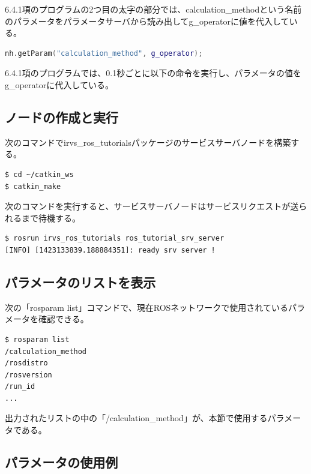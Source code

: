 6.4.1項のプログラムの2つ目の太字の部分では、calculation\_methodという名前のパラメータをパラメータサーバから読み出してg\_operatorに値を代入している。

\begin{lstlisting}[language=C++]
nh.getParam("calculation_method", g_operator);
\end{lstlisting}

6.4.1項のプログラムでは、0.1秒ごとに以下の命令を実行し、パラメータの値をg\_operatorに代入している。

\subsection{ノードの作成と実行}

次のコマンドでirvs\_ros\_tutorialsパッケージのサービスサーバノードを構築する。

\begin{lstlisting}[language=ROS]
$ cd ~/catkin_ws
$ catkin_make
\end{lstlisting}

次のコマンドを実行すると、サービスサーバノードはサービスリクエストが送られるまで待機する。

\begin{lstlisting}[language=ROS]
$ rosrun irvs_ros_tutorials ros_tutorial_srv_server
[INFO] [1423133839.188884351]: ready srv server !
\end{lstlisting}

\subsection{パラメータのリストを表示}
次の「rosparam list」コマンドで、現在ROSネットワークで使用されているパラメータを確認できる。

\begin{lstlisting}[language=ROS]
$ rosparam list
/calculation_method
/rosdistro
/rosversion
/run_id
...
\end{lstlisting}

出力されたリストの中の「/calculation\_method」が、本節で使用するパラメータである。

\subsection{パラメータの使用例}

